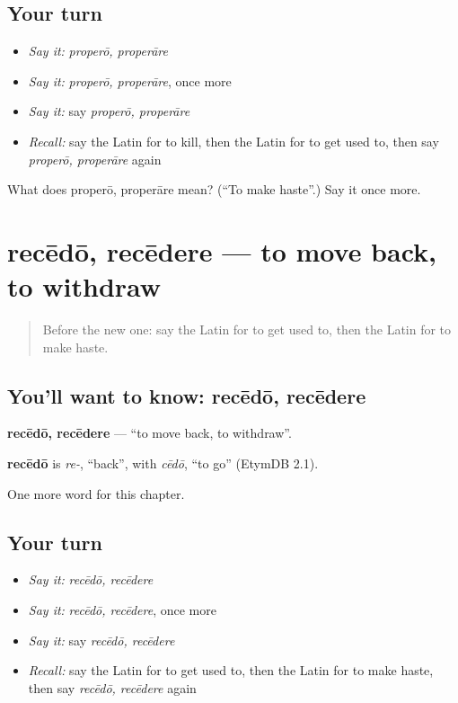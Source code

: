 \subsection*{Your turn}
\begin{itemize}
\raggedright
  \item \emph{Say it:} \emph{properō, properāre}
  \item \emph{Say it:} \emph{properō, properāre}, once more
  \item \emph{Say it:} say \emph{properō, properāre}
  \item \emph{Recall:} say the Latin for to kill, then the Latin for to get used to, then say \emph{properō, properāre} again
\end{itemize}

\begin{tcolorbox}[breakable,colback=teal!4,colframe=teal!35!black,title={Before you move on}]
What does properō, properāre mean? (\textquotedblleft{}To make haste\textquotedblright{}.) Say it once more.
\end{tcolorbox}
\section[recēdō, recēdere]{recēdō, recēdere — to move back, to withdraw}

\label{lesson:LA-C169-recedo}



\begin{quote}
Before the new one: say the Latin for to get used to, then the Latin for to make haste.
\end{quote}

\subsection*{You'll want to know: recēdō, recēdere}
\textbf{recēdō, recēdere} — \textquotedblleft{}to move back, to withdraw\textquotedblright{}.

\begin{cousinweb}
\textbf{recēdō} is \emph{re-}, \textquotedblleft{}back\textquotedblright{}, with \emph{cēdō}, \textquotedblleft{}to go\textquotedblright{} (EtymDB 2.1).
\end{cousinweb}

\begin{grammarlens}[title={What you've built}]
One more word for this chapter.
\end{grammarlens}

\subsection*{Your turn}
\begin{itemize}
\raggedright
  \item \emph{Say it:} \emph{recēdō, recēdere}
  \item \emph{Say it:} \emph{recēdō, recēdere}, once more
  \item \emph{Say it:} say \emph{recēdō, recēdere}
  \item \emph{Recall:} say the Latin for to get used to, then the Latin for to make haste, then say \emph{recēdō, recēdere} again
\end{itemize}

